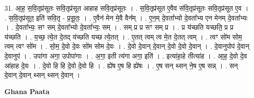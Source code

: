 \documentclass[17pt]{extarticle}
\begin{document}
31. आ॒ह॒ स॒वि॒तृप्र॑सूतः सवि॒तृप्र॑सूत आहाह सवि॒तृप्र॑सूतः । . स॒वि॒तृप्र॑सूत ए॒वैव स॑वि॒तृप्र॑सूतः सवि॒तृप्र॑सूत ए॒व । . स॒वि॒तृप्र॑सूत॒ इति॑ सवि॒तृ - प्र॒सू॒तः॒ । . ए॒वैन॑ मेन मे॒वै वैन᳚म् । . ए॒न॒म् दे॒वता᳚भ्यो दे॒वता᳚भ्य एन मेनम् दे॒वता᳚भ्यः । . दे॒वता᳚भ्यः॒ सꣳ सम् दे॒वता᳚भ्यो दे॒वता᳚भ्यः॒ सम् । . सम् प्र प्र सꣳ सम् प्र । . प्र य॑च्छति यच्छति॒ प्र प्र य॑च्छति । . य॒च्छ॒ त्ये॒त दे॒तद् य॑च्छति यच्छ त्ये॒तत् । . ए॒तत् त्वम् त्व मे॒त दे॒तत् त्वम् । . त्वꣳ सो॑म सोम॒ त्वम् त्वꣳ सो॑म । . सो॒म॒ दे॒वो दे॒वः सो॑म सोम दे॒वः । . दे॒वो दे॒वान् दे॒वान् दे॒वो दे॒वो दे॒वान् । . दे॒वानुपोप॑ दे॒वान् दे॒वानुप॑ । . उपा॑गा अगा॒ उपोपा॑गाः । . अ॒गा॒ इती त्य॑गा अगा॒ इति॑ । . इत्या॑हा॒हे तीत्या॑ह । . आ॒ह॒ दे॒वो दे॒व आ॑हाह दे॒वः । . दे॒वो हि हि दे॒वो दे॒वो हि । . ह्ये॑ष ए॒ष हि ह्ये॑षः । . ए॒ष सन् थ्सन् ने॒ष ए॒ष सन्न् । . सन् दे॒वान् दे॒वान् थ्सन् थ्सन् दे॒वान् । \newline

\textbf{Ghana Paata } \newline
\end{document}
